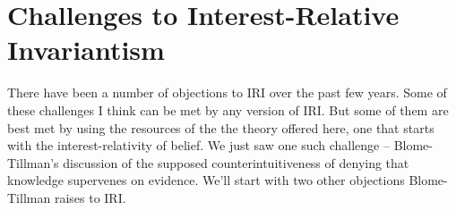 \section{Challenges to Interest-Relative Invariantism}

There have been a number of objections to IRI over the past few years. Some of these challenges I think can be met by any version of IRI. But some of them are best met by using the resources of the the theory offered here, one that starts with the interest-relativity of belief. We just saw one such challenge -- Blome-Tillman's discussion of the supposed counterintuitiveness of denying that knowledge supervenes on evidence. We'll start with two other objections Blome-Tillman raises to IRI.







